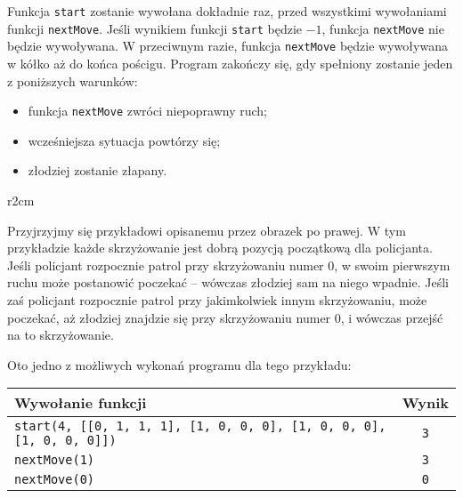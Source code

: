 \documentclass{boi2014-pl}
\renewcommand{\method}[1]{{\tt #1}}
\newcommand{\constant}[1]{{\tt #1}}
\begin{document}
    Funkcja \method{start} zostanie wywołana dokładnie raz,
    przed wszystkimi wywołaniami funkcji \method{nextMove}.
    Jeśli wynikiem funkcji \method{start} będzie $-1$,
    funkcja \method{nextMove} nie będzie wywoływana.
    W przeciwnym razie, funkcja \method{nextMove} będzie wywoływana w kółko
    aż do końca pościgu.
    Program zakończy się, gdy spełniony zostanie jeden z poniższych warunków:
    \begin{itemize}
        \item funkcja \method{nextMove} zwróci niepoprawny ruch;
        \item wcześniejsza sytuacja powtórzy się;
        \item złodziej zostanie złapany.
    \end{itemize}

    \Example
    \begin{wrapfigure}[4]{r}{2cm}
        \vspace{-0.5cm}
        \centering
    \end{wrapfigure}
    Przyjrzyjmy się przykładowi opisanemu przez obrazek po prawej.
    W tym przykładzie każde skrzyżowanie jest dobrą pozycją początkową dla policjanta.
    Jeśli policjant rozpocznie patrol przy skrzyżowaniu numer 0, w swoim pierwszym ruchu
    może postanowić poczekać -- wówczas złodziej sam na niego wpadnie.
    Jeśli zaś policjant rozpocznie patrol przy jakimkolwiek innym skrzyżowaniu, może poczekać,
    aż złodziej znajdzie się przy skrzyżowaniu numer 0, i wówczas przejść na to skrzyżowanie.
   
    Oto jedno z możliwych wykonań programu dla tego przykładu:

    \begin{tabular}{|l|c|}
        \hline
            {\bf Wywołanie funkcji} & {\bf Wynik} \\
        \hline
            \method{start(4, [[0, 1, 1, 1], [1, 0, 0, 0], [1, 0, 0, 0], [1, 0, 0, 0]])} &
            \constant{3} \\
        \hline
            \method{nextMove(1)} & \constant{3} \\
        \hline
            \method{nextMove(0)} & \constant{0} \\
        \hline
    \end{tabular}
\end{document}
